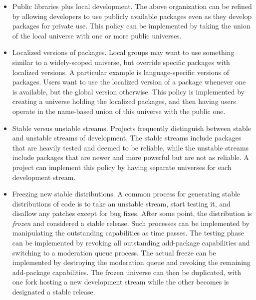 \documentclass{article}
\begin{document}
\begin{itemize}
\item Public libraries plus local development.  The above organization
      can be refined by allowing developers to use publicly
      available packages even as they develop packages for private
      use.  This policy can be implemented by taking the union of the
      local universe with one or more public universes.


\item Localized versions of packages.  Local groups may want to use
      something similar to a widely-scoped universe, but override
      specific packages with localized versions.  A particular example
      is language-specific versions of packages.  Users want to use
      the localized version of a package whenever one is available,
      but the global version otherwise.  This policy is implemented by
      creating a universe holding the localized packages, and then
      having users operate in the name-based union of this universe
      with the public one.

\item Stable versus unstable streams.  Projects frequently distinguish
      between stable and unstable streams of development.  The stable
      streams include packages that are heavily tested and deemed to
      be reliable, while the unstable streams include packages that
      are newer and more powerful but are not as reliable.  A
      project can implement this policy by having separate universes
      for each development stream.  

\item Freezing new stable distributions.  A common process for
      generating stable distributions of code is to take an unstable
      stream, start testing it, and disallow any patches except for
      bug fixes.
      After some
      point, the distribution is \emph{frozen} and considered a stable
      release.  Such processes can be implemented by manipulating the
      outstanding capabilities as time passes.  The testing phase can
      be implemented by revoking all outstanding add-package
      capabilities and switching to a moderation queue process.  The
      actual freeze can be implemented by destroying the moderation
      queue and revoking the remaining add-package capabilities.  The
      frozen universe can then be duplicated, with one fork hosting
      a new development stream while the other becomes is designated
      a stable release.
\end{itemize}
\end{document}
